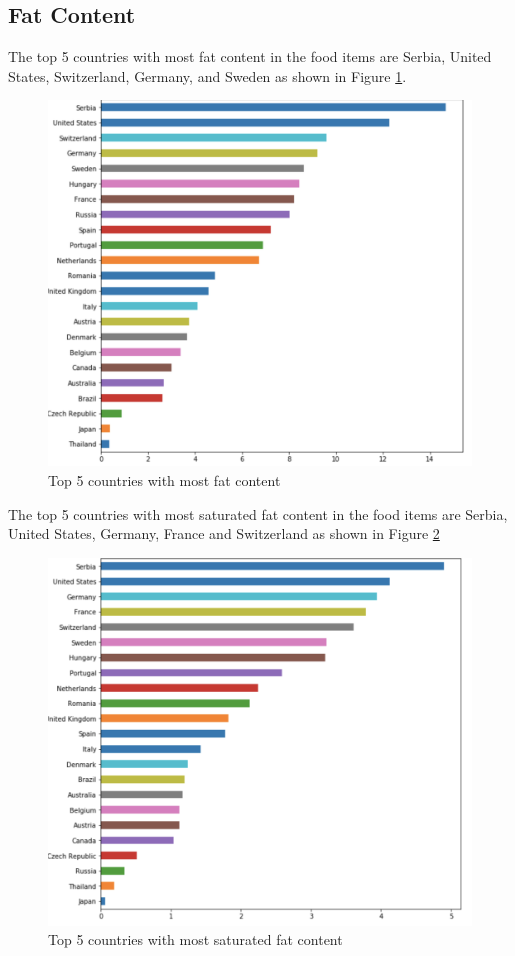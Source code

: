 \documentclass[sigconf]{acmart}
\begin{document}
\subsection{Fat Content}
The top 5 countries with most fat content in the food items are Serbia, United States, Switzerland, Germany, and Sweden as shown in Figure \ref{fig:Fig8}.
    
\begin{figure}
\includegraphics[width=1.0\columnwidth]{images/fig8.png}
\caption{Top 5 countries with most fat content \cite{code-base}}
\label{fig:Fig8}
\end{figure}

The top 5 countries with most saturated fat content in the food items are Serbia, United States, Germany, France and Switzerland as shown in Figure \ref{fig:Fig9}
    
\begin{figure}
\includegraphics[width=1.0\columnwidth]{images/fig9.png}
\caption{Top 5 countries with most saturated fat content \cite{code-base}}
\label{fig:Fig9}
\end{figure}
\end{document}
